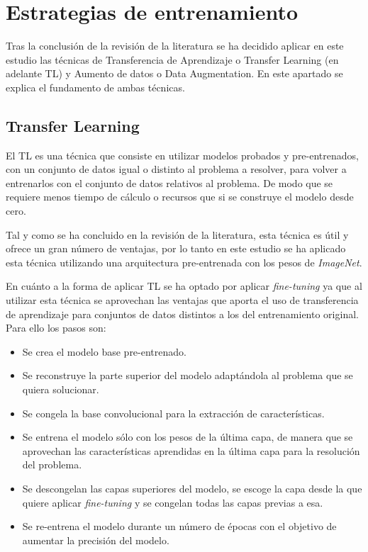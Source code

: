 \section{Estrategias de entrenamiento}\label{sec:estrategias-de-entrenamiento}
Tras la conclusión de la revisión de la literatura se ha decidido aplicar en este estudio las técnicas de Transferencia
de Aprendizaje o Transfer Learning (en adelante TL) y Aumento de datos o Data Augmentation.
En este apartado se explica el fundamento de ambas técnicas.

\subsection{Transfer Learning}\label{subsec:transfer-learning}
El TL es una técnica que consiste en utilizar modelos probados y pre-entrenados, con un conjunto de datos igual o
distinto al problema a resolver, para volver a entrenarlos con el conjunto de datos relativos al problema.
De modo que se requiere menos tiempo de cálculo o recursos que si se construye el modelo desde cero.

Tal y como se ha concluido en la revisión de la literatura, esta técnica es útil y ofrece un gran número de ventajas,
por lo tanto en este estudio se ha aplicado esta técnica utilizando una arquitectura pre-entrenada con los pesos de
\textit{ImageNet}.

En cuánto a la forma de aplicar TL se ha optado por aplicar \textit{fine-tuning} ya que al utilizar esta técnica se
aprovechan las ventajas que aporta el uso de transferencia de aprendizaje para conjuntos de datos distintos a los del
entrenamiento original.
Para ello los pasos son:
\begin{itemize}
    \item Se crea el modelo base pre-entrenado.
    \item Se reconstruye la parte superior del modelo adaptándola al problema que se quiera solucionar.
    \item Se congela la base convolucional para la extracción de características.
    \item Se entrena el modelo sólo con los pesos de la última capa, de manera que se aprovechan las características
    aprendidas en la última capa para la resolución del problema.
    \item Se descongelan las capas superiores del modelo, se escoge la capa desde la que quiere aplicar
    \textit{fine-tuning} y se congelan todas las capas previas a esa.
    \item Se re-entrena el modelo durante un número de épocas con el objetivo de aumentar la precisión del modelo.\\
\end{itemize}

